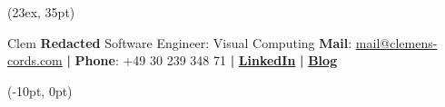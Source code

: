 \documentclass[11pt]{article}
\begin{document}

\begin{textblock*}{\paperwidth}(23ex, 35pt)
\begin{flushleft}
{\fontsize{30}{35}\selectfont \!Clem \textbf{Redacted}} \newline
{\color{my_pink} {Software Engineer: Visual Computing}} \newline
\newline
\textbf{Mail}: \href{mailto:mail@clemens-cords.com}{mail@clemens-cords.com} \textbf{|} \textbf{Phone}: +49 30 239 348 71 \textbf{|} \href{https://www.linkedin.com/in/clemens-cords/}{\textbf{LinkedIn}} \textbf{|} \href{http://clemens-cords.com/}{\textbf{Blog}}
\end{flushleft}
\end{textblock*}

\begin{textblock*}{\paperwidth}(-10pt, 0pt)
\end{textblock*}
\end{document}
